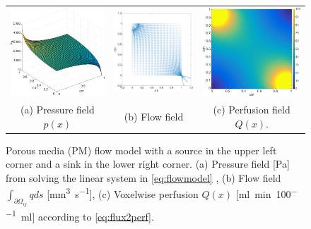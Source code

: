 \documentclass[paper=a4, fontsize=11pt,parskip=half,headings=small]{scrartcl}
\newcommand{\Perf}{Q}
\newcommand{\siFmm}{\milli\meter\cubed\per\second}
\newcommand{\siPml}{\milli\litre\per\minute\per100\milli\litre}
\begin{document}
		\begin{figure}[H]
		\centering
		\begin{tabular}{c c c}
			\includegraphics[width=.3\textwidth]{figs/pressure.eps} & \includegraphics[width=.3\textwidth]{figs/flowQuiver.eps} & \includegraphics[width=.3\textwidth]{figs/perfusion.eps}\\
			(a) Pressure field $p(x)$ & (b) Flow field & (c) Perfusion field $\Perf(x)$.
		\end{tabular}
    	\caption{Porous media (PM) flow model with a source in the upper left corner and a sink in the lower right corner. (a) Pressure field [\si{\pascal}] from solving the linear system in \eqref{eq:flowmodel} , (b) Flow field $\int_{\partial \Omega_{ij}}q ds$ [\si{\siFmm}], (c) Voxelwise perfusion $\Perf(x)$ [\si{\siPml}] according to \eqref{eq:flux2perf}.}
	        \label{fig:flowpressureperfusion}
	\end{figure}
\end{document}
